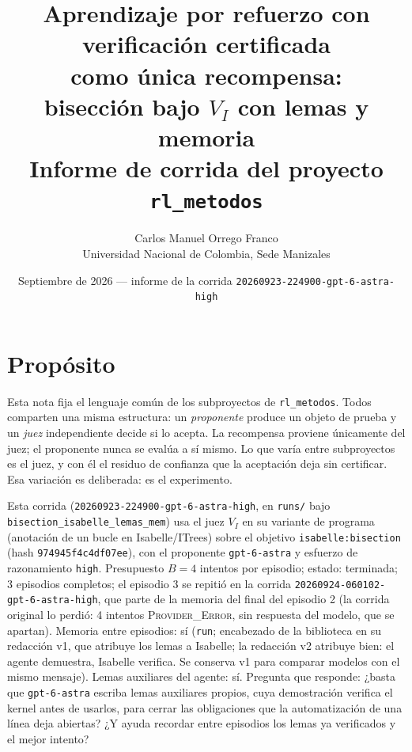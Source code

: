 \documentclass[11pt,a4paper]{article}
\title{Aprendizaje por refuerzo con verificación certificada\\como única recompensa:\\bisección bajo $V_I$ con lemas y memoria\\[0.4em]\large Informe de corrida del proyecto \texttt{rl\_metodos}}
\author{Carlos Manuel Orrego Franco\\Universidad Nacional de Colombia, Sede Manizales}
\date{Septiembre de 2026 --- informe de la corrida \texttt{20260923-\allowbreak{}224900-\allowbreak{}gpt-\allowbreak{}6-\allowbreak{}astra-\allowbreak{}high}}
\begin{document}
\maketitle

\section{Propósito}

Esta nota fija el lenguaje común de los subproyectos de \texttt{rl\_metodos}. Todos comparten una misma estructura: un \emph{proponente} produce un objeto de prueba y un \emph{juez} independiente decide si lo acepta. La recompensa proviene únicamente del juez; el proponente nunca se evalúa a sí mismo. Lo que varía entre subproyectos es el juez, y con él el residuo de confianza que la aceptación deja sin certificar. Esa variación es deliberada: es el experimento.

{\sloppy Esta corrida (\texttt{20260923-\allowbreak{}224900-\allowbreak{}gpt-\allowbreak{}6-\allowbreak{}astra-\allowbreak{}high}, en \texttt{runs/} bajo \texttt{bisection\_\allowbreak{}isabelle\_\allowbreak{}lemas\_\allowbreak{}mem}) usa el juez $V_I$ en su variante de programa (anotación de un bucle en Isabelle/ITrees) sobre el objetivo \texttt{isabelle:\allowbreak{}bisection} (hash \texttt{974945f4c4df07ee}), con el proponente \texttt{gpt-\allowbreak{}6-\allowbreak{}astra} y esfuerzo de razonamiento \texttt{high}. Presupuesto $B = 4$ intentos por episodio; estado: terminada; 3 episodios completos; el episodio 3 se repitió en la corrida \texttt{20260924-\allowbreak{}060102-\allowbreak{}gpt-\allowbreak{}6-\allowbreak{}astra-\allowbreak{}high}, que parte de la memoria del final del episodio 2 (la corrida original lo perdió: 4 intentos \textsc{Provider\_Error}, sin respuesta del modelo, que se apartan). Memoria entre episodios: sí (\texttt{run}; encabezado de la biblioteca en su redacción v1, que atribuye los lemas a Isabelle; la redacción v2 atribuye bien: el agente demuestra, Isabelle verifica. Se conserva v1 para comparar modelos con el mismo mensaje). Lemas auxiliares del agente: sí. Pregunta que responde: ¿basta que \texttt{gpt-\allowbreak{}6-\allowbreak{}astra} escriba lemas auxiliares propios, cuya demostración verifica el kernel antes de usarlos, para cerrar las obligaciones que la automatización de una línea deja abiertas? ¿Y ayuda recordar entre episodios los lemas ya verificados y el mejor intento?\par}
\end{document}
